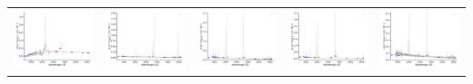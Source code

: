\begin{center}
\begin{longtable}{l l l l l }
    \includegraphics[width=0.2\linewidth, clip]{Figs/Figs-sdss/spec-9207-57667-0050-STRIPE82-0148-001139.pdf} & \includegraphics[width=0.2\linewidth, clip]{Figs/Figs-sdss/spec-0406-51900-0604-STRIPE82-0054-040145.pdf} & \includegraphics[width=0.2\linewidth, clip]{Figs/Figs-sdss/spec-0408-51821-0296-STRIPE82-0057-019420.pdf} & \includegraphics[width=0.2\linewidth, clip]{Figs/Figs-sdss/spec-0409-51871-0225-STRIPE82-0059-048815.pdf} & \includegraphics[width=0.2\linewidth, clip]{Figs/Figs-sdss/spec-0409-51871-0596-STRIPE82-0062-010774.pdf} \\

\end{longtable}
\end{center}
